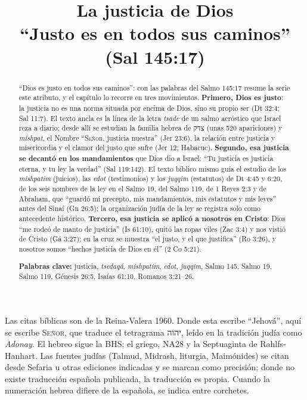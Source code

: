 \documentclass[11pt,letterpaper]{article}
\title{\color{azul}\bfseries La justicia de Dios\\[4pt]\large\color{gris}\mdseries ``Justo es \SENOR{} en todos sus caminos'' (Sal 145:17)}
\author{}\date{}
\newcommand{\heb}[1]{\mbox{\foreignlanguage{hebrew}{#1}}}
\newcommand{\SENOR}{\textsc{Señor}}
\begin{document}
\maketitle\thispagestyle{empty}

\begin{abstract}\noindent
``Dios es justo en todos sus caminos'': con las palabras del Salmo 145:17 resume la serie este atributo, y el capítulo lo recorre en tres movimientos. \textbf{Primero, Dios es justo}: la justicia no es una norma situada por encima de Dios, sino su propio ser (Dt 32:4; Sal 11:7). El texto ancla es la línea de la letra \emph{tsade} de un salmo acróstico que Israel reza a diario; desde allí se estudian la familia hebrea de \heb{צדק} (unas 520 apariciones) y \emph{mishpat}, el Nombre ``\SENOR, justicia nuestra'' (Jer 23:6), la relación entre justicia y misericordia y el clamor del justo que sufre (Jer 12; Habacuc). \textbf{Segundo, esa justicia se decantó en los mandamientos} que Dios dio a Israel: ``Tu justicia es justicia eterna, y tu ley la verdad'' (Sal 119:142). El texto bíblico mismo guía el estudio de los \emph{mishpatim} (juicios), las \emph{edot} (testimonios) y los \emph{juqqim} (estatutos) de Dt 4:45 y 6:20, de los seis nombres de la ley en el Salmo 19, del Salmo 119, de 1 Reyes 2:3 y de Abraham, que ``guardó mi precepto, mis mandamientos, mis estatutos y mis leyes'' antes del Sinaí (Gn 26:5); la organización judía de la ley se registra solo como antecedente histórico. \textbf{Tercero, esa justicia se aplicó a nosotros en Cristo}: Dios ``me rodeó de manto de justicia'' (Is 61:10), quitó las ropas viles (Zac 3:4) y nos vistió de Cristo (Gá 3:27); en la cruz se muestra ``el justo, y el que justifica'' (Ro 3:26), y nosotros somos ``hechos justicia de Dios en él'' (2 Co 5:21).
\par\smallskip\noindent\textbf{Palabras clave:} justicia, \emph{tsedaqá}, \emph{mishpatim}, \emph{edot}, \emph{juqqim}, Salmo 145, Salmo 19, Salmo 119, Génesis 26:5, Isaías 61:10, Romanos 3:21--26.\end{abstract}

\begin{nota}
Las citas bíblicas son de la Reina-Valera 1960. Donde esta escribe ``Jehová'', aquí se escribe \SENOR, que traduce el tetragrama \heb{יהוה}, leído en la tradición judía como \emph{Adonay}. El hebreo sigue la BHS; el griego, NA28 y la Septuaginta de Rahlfs-Hanhart. Las fuentes judías (Talmud, Midrash, liturgia, Maimónides) se citan desde Sefaria u otras ediciones indicadas y se marcan como precisión; donde no existe traducción española publicada, la traducción es propia. Cuando la numeración hebrea difiere de la española, se indica entre corchetes.
\end{nota}
\end{document}

